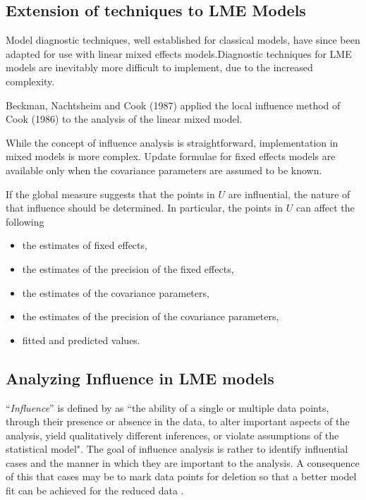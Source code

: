 \documentclass[Main.tex]{subfiles}
\begin{document}
		\subsection{Extension of techniques to LME Models} %
		
		Model diagnostic techniques, well established for classical models, have since been adapted for use with linear mixed effects models.Diagnostic techniques for LME models are inevitably more difficult to implement, due to the increased complexity.
		
		Beckman, Nachtsheim and Cook (1987) \citet{Beckman} applied the local influence method of Cook (1986) to the analysis of the linear mixed model.
		
		While the concept of influence analysis is straightforward, implementation in mixed models is more complex. Update formulae for fixed effects models are available only when the covariance parameters are assumed to be known.
		
		If the global measure suggests that the points in $U$ are influential, the nature of that influence should be determined. In particular, the points in $U$ can affect the following
		
		\begin{itemize}
			\item the estimates of fixed effects,
			\item the estimates of the precision of the fixed effects,
			\item the estimates of the covariance parameters,
			\item the estimates of the precision of the covariance parameters,
			\item fitted and predicted values.
		\end{itemize}


				\subsection{Analyzing Influence in LME models}
				``\textit{Influence}” is defined by \citet{schab} as ``the ability of a single or multiple data points, through their presence
				or absence in the data, to alter important aspects of the analysis, yield qualitatively different inferences, or
				violate assumptions of the statistical model". The goal of influence analysis is rather to identify influential cases and the manner in
				which they are important to the analysis. A consequence of this that cases may be to mark data
				points for deletion so that a better model fit can be achieved for the reduced data \citep{schab}.  
				
\end{document}
